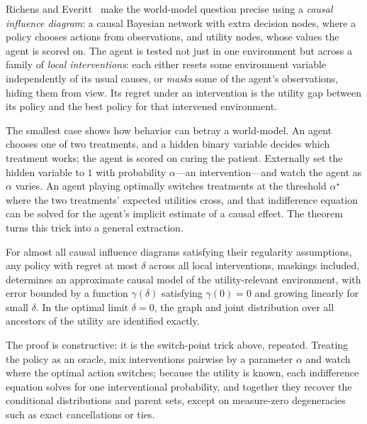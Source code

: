 Richens and Everitt~\cite{richens2024} make the world-model question precise using a \emph{causal influence diagram}: a causal Bayesian network with extra decision nodes, where a policy chooses actions from observations, and utility nodes, whose values the agent is scored on. The agent is tested not just in one environment but across a family of \emph{local interventions}: each either resets some environment variable independently of its usual causes, or \emph{masks} some of the agent's observations, hiding them from view. Its regret under an intervention is the utility gap between its policy and the best policy for that intervened environment.

The smallest case shows how behavior can betray a world-model. An agent chooses one of two treatments, and a hidden binary variable decides which treatment works; the agent is scored on curing the patient. Externally set the hidden variable to $1$ with probability $\alpha$---an intervention---and watch the agent as $\alpha$ varies. An agent playing optimally switches treatments at the threshold $\alpha^\star$ where the two treatments' expected utilities cross, and that indifference equation can be solved for the agent's implicit estimate of a causal effect. The theorem turns this trick into a general extraction.

\begin{theorem*}
For almost all causal influence diagrams satisfying their regularity assumptions, any policy with regret at most $\delta$ across all local interventions, maskings included, determines an approximate causal model of the utility-relevant environment, with error bounded by a function $\gamma(\delta)$ satisfying $\gamma(0)=0$ and growing linearly for small $\delta$. In the optimal limit $\delta=0$, the graph and joint distribution over all ancestors of the utility are identified exactly.
\end{theorem*}

The proof is constructive: it is the switch-point trick above, repeated. Treating the policy as an oracle, mix interventions pairwise by a parameter $\alpha$ and watch where the optimal action switches; because the utility is known, each indifference equation solves for one interventional probability, and together they recover the conditional distributions and parent sets, except on measure-zero degeneracies such as exact cancellations or ties.

